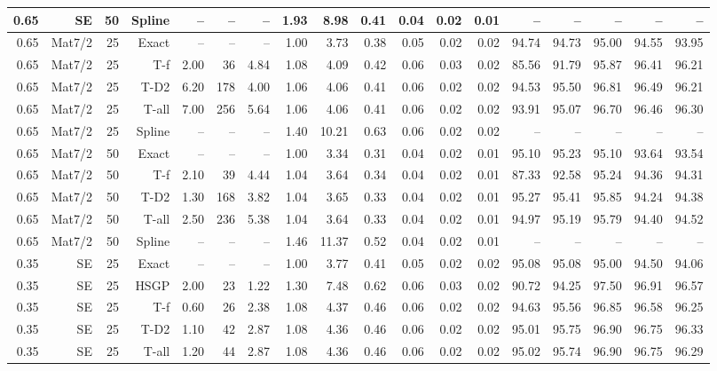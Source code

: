 \documentclass[11pt,a4paper]{article}
\theoremstyle{definition}
\theoremstyle{remark}
\begin{document}
\begin{table}[htbp]
{\begin{tabular}{
rrrrrrr|rrrrrr|rrrrr
}
0.65 & SE & 50 & Spline & -- & -- & -- & 1.93 & 8.98 & 0.41 & 0.04 & 0.02 & 0.01 & -- & -- & -- & -- & -- \\
\hline
0.65 & Mat7/2 & 25 & Exact & -- & -- & -- & 1.00 & 3.73 & 0.38 & 0.05 & 0.02 & 0.02 & 94.74 & 94.73 & 95.00 & 94.55 & 93.95 \\
0.65 & Mat7/2 & 25 & T-f & 2.00 & 36 & 4.84 & 1.08 & 4.09 & 0.42 & 0.06 & 0.03 & 0.02 & 85.56 & 91.79 & 95.87 & 96.41 & 96.21 \\
0.65 & Mat7/2 & 25 & T-D2 & 6.20 & 178 & 4.00 & 1.06 & 4.06 & 0.41 & 0.06 & 0.02 & 0.02 & 94.53 & 95.50 & 96.81 & 96.49 & 96.21 \\
0.65 & Mat7/2 & 25 & T-all & 7.00 & 256 & 5.64 & 1.06 & 4.06 & 0.41 & 0.06 & 0.02 & 0.02 & 93.91 & 95.07 & 96.70 & 96.46 & 96.30 \\
0.65 & Mat7/2 & 25 & Spline & -- & -- & -- & 1.40 & 10.21 & 0.63 & 0.06 & 0.02 & 0.02 & -- & -- & -- & -- & -- \\
\hline
0.65 & Mat7/2 & 50 & Exact & -- & -- & -- & 1.00 & 3.34 & 0.31 & 0.04 & 0.02 & 0.01 & 95.10 & 95.23 & 95.10 & 93.64 & 93.54 \\
0.65 & Mat7/2 & 50 & T-f & 2.10 & 39 & 4.44 & 1.04 & 3.64 & 0.34 & 0.04 & 0.02 & 0.01 & 87.33 & 92.58 & 95.24 & 94.36 & 94.31 \\
0.65 & Mat7/2 & 50 & T-D2 & 1.30 & 168 & 3.82 & 1.04 & 3.65 & 0.33 & 0.04 & 0.02 & 0.01 & 95.27 & 95.41 & 95.85 & 94.24 & 94.38 \\
0.65 & Mat7/2 & 50 & T-all & 2.50 & 236 & 5.38 & 1.04 & 3.64 & 0.33 & 0.04 & 0.02 & 0.01 & 94.97 & 95.19 & 95.79 & 94.40 & 94.52 \\
0.65 & Mat7/2 & 50 & Spline & -- & -- & -- & 1.46 & 11.37 & 0.52 & 0.04 & 0.02 & 0.01 & -- & -- & -- & -- & -- \\
\hline
0.35 & SE & 25 & Exact & -- & -- & -- & 1.00 & 3.77 & 0.41 & 0.05 & 0.02 & 0.02 & 95.08 & 95.08 & 95.00 & 94.50 & 94.06 \\
0.35 & SE & 25 & HSGP & 2.00 & 23 & 1.22 & 1.30 & 7.48 & 0.62 & 0.06 & 0.03 & 0.02 & 90.72 & 94.25 & 97.50 & 96.91 & 96.57 \\
0.35 & SE & 25 & T-f & 0.60 & 26 & 2.38 & 1.08 & 4.37 & 0.46 & 0.06 & 0.02 & 0.02 & 94.63 & 95.56 & 96.85 & 96.58 & 96.25 \\
0.35 & SE & 25 & T-D2 & 1.10 & 42 & 2.87 & 1.08 & 4.36 & 0.46 & 0.06 & 0.02 & 0.02 & 95.01 & 95.75 & 96.90 & 96.75 & 96.33 \\
0.35 & SE & 25 & T-all & 1.20 & 44 & 2.87 & 1.08 & 4.36 & 0.46 & 0.06 & 0.02 & 0.02 & 95.02 & 95.74 & 96.90 & 96.75 & 96.29 \\

\end{tabular}}
\end{table}
\end{document}
